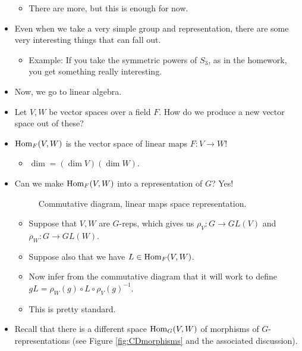 \documentclass[../notes.tex]{subfiles}
\begin{document}
\begin{itemize}
\begin{itemize}
        \item There are more, but this is enough for now.
    \end{itemize}
    \item Even when we take a very simple group and representation, there are some very interesting things that can fall out.
    \begin{itemize}
        \item Example: If you take the symmetric powers of $S_3$, as in the homework, you get something really interesting.
    \end{itemize}
    \item Now, we go to linear algebra.
    \item Let $V,W$ be vector spaces over a field $F$. How do we produce a new vector space out of these?
    \item $\operatorname{Hom}_F(V,W)$ is the vector space of linear maps $F:V\to W$!
    \begin{itemize}
        \item $\dim=(\dim V)(\dim W)$.
    \end{itemize}
    \item Can we make $\operatorname{Hom}_F(V,W)$ into a representation of $G$? Yes!
    \begin{figure}[H]
        \centering
        \DisableQuotes
        \EnableQuotes
        \vspace{-1.5em}
        \caption{Commutative diagram, linear maps space representation.}
        \label{fig:CDlinMapsRep}
    \end{figure}
    \begin{itemize}
        \item Suppose that $V,W$ are $G$-reps, which gives us $\rho_V:G\to GL(V)$ and $\rho_W:G\to GL(W)$.
        \item Suppose also that we have $L\in\operatorname{Hom}_F(V,W)$.
        \item Now infer from the commutative diagram that it will work to define $gL=\rho_W(g)\circ L\circ\rho_V(g)^{-1}$.
        \item This is pretty standard.
    \end{itemize}
    \item Recall that there is a different space $\operatorname{Hom}_G(V,W)$ of morphisms of $G$-representations (see Figure \ref{fig:CDmorphisms} and the associated discussion).

\end{itemize}
\end{document}
